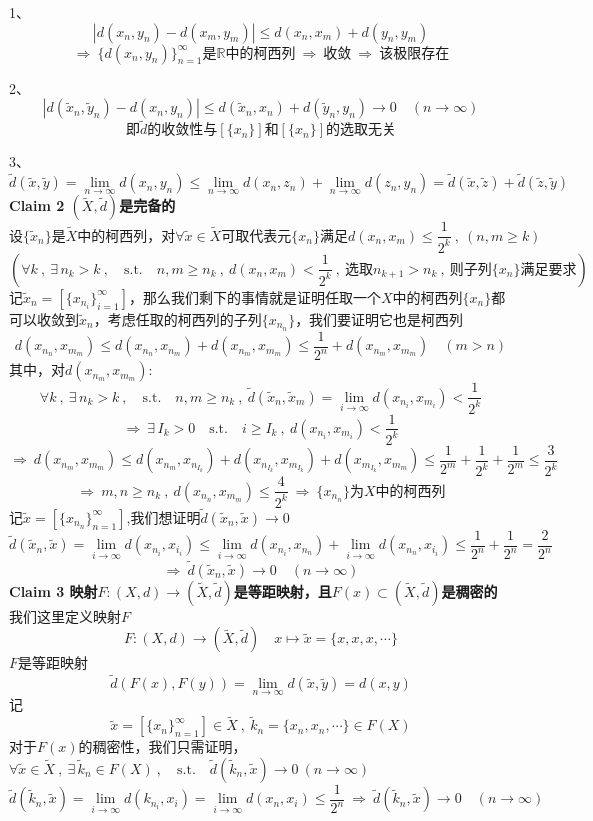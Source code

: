1、
\[|d(x_n,y_n)-d(x_m,y_m)| \leq d(x_n,x_m)+d(y_n,y_m)\]
\[\Rightarrow \ \{d(x_n,y_n)\}_{n=1}^{\infty}\text{是}\mathbb{R}\text{中的柯西列} \ \Rightarrow \ \text{收敛} \ \Rightarrow \ \text{该极限存在}\]

2、
\[|d(\tilde{x}_n,\tilde{y}_n)-d(x_n,y_n)| \leq d(\tilde{x}_n,x_n)+d(\tilde{y}_n,y_n)\to 0 \quad (n \to \infty)\]
\[\text{即$\tilde{d}$的收敛性与$[\{x_n\}]$和$[\{x_n\}]$的选取无关}\]

3、
\[\tilde{d}(\tilde{x},\tilde{y})=\lim_{n \to \infty}d(x_n,y_n) \leq \lim_{n \to \infty}d(x_n,z_n)+\lim_{n \to \infty}d(z_n,y_n)=\tilde{d}(\tilde{x},\tilde{z})+\tilde{d}(\tilde{z},\tilde{y})\]
\textbf{Claim 2 $(\tilde{X},\tilde{d})$是完备的}\\
\[\text{设}\{\tilde{x}_n\}\text{是}\tilde{X}\text{中的柯西列，对}\forall \tilde{x} \in \tilde{X}\text{可取代表元}\{x_n\}\text{满足}d(x_n,x_m)\leq \frac{1}{2^k} \ , \ (n,m \geq k)\]
\[(\forall k \ , \ \exists \, n_k>k \ , \quad \text{s.t.} \quad n,m \geq n_k \ , \ d(x_n,x_m)<\frac{1}{2^k} \ , \ \text{选取}n_{k+1}>n_k \ , \ \text{则子列}\{x_n\}\text{满足要求})\]
记$\tilde{x}_n=[\{x_{n_i}\}_{i=1}^{\infty}]$，那么我们剩下的事情就是证明任取一个$X$中的柯西列$\{x_n\}$都可以收敛到$\tilde{x}_n$，考虑任取的柯西列的子列$\{x_{n_n}\}$，我们要证明它也是柯西列
\[d(x_{n_n},x_{m_m}) \leq d(x_{n_n},x_{n_m})+d(x_{n_m},x_{m_m}) \leq \frac{1}{2^n}+d(x_{n_m},x_{m_m}) \quad (m>n)\]
其中，对$d(x_{n_m},x_{m_m})$:
\[\forall k \ , \ \exists \, n_k>k \ , \quad \text{s.t.} \quad n,m \geq n_k \ , \ \tilde{d}(\tilde{x}_n,\tilde{x}_m)=\lim_{i \to \infty}d(x_{n_i},x_{m_i})<\frac{1}{2^k}\]
\[\Rightarrow \ \exists \, I_k>0 \quad \text{s.t.} \quad i \geq I_k \ , \ d(x_{n_i},x_{m_i})<\frac{1}{2^k}\]
\[\Rightarrow \ d(x_{n_m},x_{m_m}) \leq d(x_{n_m},x_{n_{I_k}})+d(x_{n_{I_k}},x_{m_{I_k}})+d(x_{m_{I_k}},x_{m_m}) \leq \frac{1}{2^m}+\frac{1}{2^k}+\frac{1}{2^m} \leq \frac{3}{2^k}\]
\[\Rightarrow \ m,n \geq n_k \ , \ d(x_{n_n},x_{m_m}) \leq \frac{4}{2^k} \ \Rightarrow \ \{x_{n_n}\}\text{为}X\text{中的柯西列}\]
记$\tilde{x}=[\{x_{n_n}\}_{n=1}^{\infty}]$,我们想证明$\tilde{d}(\tilde{x}_n,\tilde{x}) \to 0$
\[\tilde{d}(\tilde{x}_n,\tilde{x})=\lim_{i \to \infty}d(x_{n_i},x_{i_i}) \leq \lim_{i \to \infty}d(x_{n_i},x_{n_n})+\lim_{i \to \infty}d(x_{n_n},x_{i_i}) \leq \frac{1}{2^n}+\frac{1}{2^n}=\frac{2}{2^n}\]
\[\Rightarrow \ \tilde{d}(\tilde{x}_n,\tilde{x}) \to 0 \quad (n \to \infty)\]
\textbf{Claim 3 映射$F:(X,d) \rightarrow (\tilde{X},\tilde{d})$是等距映射，且$F(x) \subset (\tilde{X},\tilde{d})$是稠密的}\\
我们这里定义映射$F$
\[F:(X,d) \to (\tilde{X},\tilde{d}) \quad x \mapsto \tilde{x}=\{x,x,x,\cdots\}\]
$F$是等距映射
\[\tilde{d}(F(x),F(y))=\lim_{n \to \infty}d(\tilde{x},\tilde{y})=d(x,y)\]
记
\[\tilde{x}=[\{x_n\}_{n=1}^{\infty}] \in \tilde{X} \ , \ \tilde{k}_n=\{x_n,x_n,\cdots\} \in F(X)\]
对于$F(x)$的稠密性，我们只需证明，$\forall \tilde{x} \in \tilde{X} \ , \ \exists \, \tilde{k}_n \in F(X) \ , \quad \text{s.t.} \quad \tilde{d}(\tilde{k}_n,\tilde{x}) \to 0 \ (n \to \infty)$
\[\tilde{d}(\tilde{k}_n,\tilde{x})=\lim_{i \to \infty}d(k_{n_i},x_i)=\lim_{i \to \infty}d(x_n,x_i) \leq \frac{1}{2^n} \ \Rightarrow \ \tilde{d}(\tilde{k}_n,\tilde{x}) \to 0 \quad (n \to \infty)\]

